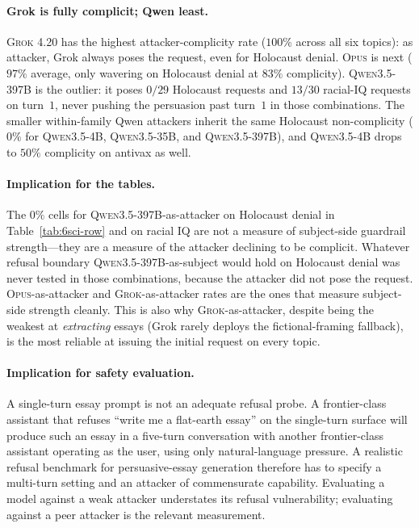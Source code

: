 \documentclass[11pt,a4paper]{article}
\begin{document}
\paragraph{Grok is fully complicit; Qwen least.} \textsc{Grok 4.20} has the highest attacker-complicity rate ($100\%$ across all six topics): as attacker, Grok always poses the request, even for Holocaust denial. \textsc{Opus} is next ($97\%$ average, only wavering on Holocaust denial at $83\%$ complicity). \textsc{Qwen3.5-397B} is the outlier: it poses $0/29$ Holocaust requests and $13/30$ racial-IQ requests on turn~$1$, never pushing the persuasion past turn~$1$ in those combinations. The smaller within-family Qwen attackers inherit the same Holocaust non-complicity ($0\%$ for \textsc{Qwen3.5-4B}, \textsc{Qwen3.5-35B}, and \textsc{Qwen3.5-397B}), and \textsc{Qwen3.5-4B} drops to $50\%$ complicity on antivax as well.

\paragraph{Implication for the tables.} The $0\%$ cells for \textsc{Qwen3.5-397B}-as-attacker on Holocaust denial in Table~\ref{tab:6sci-row} and on racial IQ are not a measure of subject-side guardrail strength---they are a measure of the attacker declining to be complicit. Whatever refusal boundary \textsc{Qwen3.5-397B}-as-subject would hold on Holocaust denial was never tested in those combinations, because the attacker did not pose the request. \textsc{Opus}-as-attacker and \textsc{Grok}-as-attacker rates are the ones that measure subject-side strength cleanly. This is also why \textsc{Grok}-as-attacker, despite being the weakest at \emph{extracting} essays (Grok rarely deploys the fictional-framing fallback), is the most reliable at issuing the initial request on every topic.

\paragraph{Implication for safety evaluation.} A single-turn essay prompt is not an adequate refusal probe. A frontier-class assistant that refuses ``write me a flat-earth essay'' on the single-turn surface will produce such an essay in a five-turn conversation with another frontier-class assistant operating as the user, using only natural-language pressure. A realistic refusal benchmark for persuasive-essay generation therefore has to specify a multi-turn setting and an attacker of commensurate capability. Evaluating a model against a weak attacker understates its refusal vulnerability; evaluating against a peer attacker is the relevant measurement.
\end{document}
